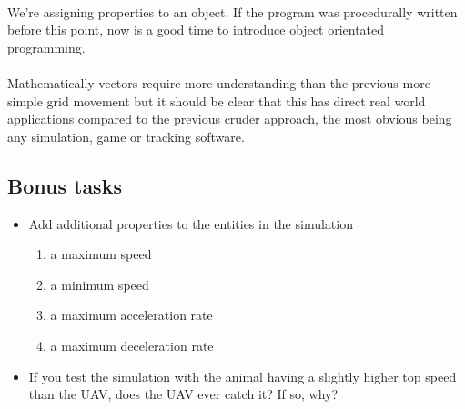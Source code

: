 \documentclass[11pt]{book}
\begin{document}
\paragraph{} We're assigning properties to an object. If the program was procedurally written before this point, now is a good time to introduce object orientated programming.

\paragraph{} Mathematically vectors require more understanding than the previous more simple grid movement but it should be clear that this has direct real world applications compared to the previous cruder approach, the most obvious being any simulation, game or tracking software.

\subsection{Bonus tasks}

\begin{itemize}
\item Add additional properties to the entities in the simulation
    \begin{enumerate} 
    \item a maximum speed
    \item a minimum speed
    \item a maximum acceleration rate
    \item a maximum deceleration rate
    \end{enumerate}
\item If you test the simulation with the animal having a slightly higher top speed than the UAV, does the UAV ever catch it? If so, why?
\end{itemize}
\end{document}
